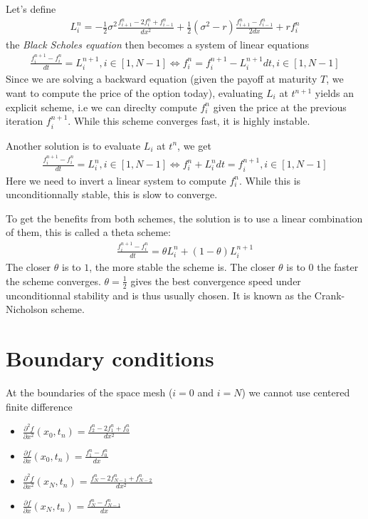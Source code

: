 \documentclass[a4paper]{article}
\begin{document}
Let's define
\begin{gather*}L_i^n = -\frac{1}{2}\sigma^2\frac{f_{i+1}^n - 2 f_i^n + f_{i-1}^n}{dx^2} + \frac{1}{2}(\sigma^2 - r)  \frac{f_{i+1}^n - f_{i-1}^n}{2dx} + rf_i^n
\end{gather*}  the \textit{Black Scholes equation} then becomes a system of linear equations
\begin{gather*}
\frac{f_i^{n+1} - f_i^{n}}{dt} = L_i^{n+1}, i \in [1, N-1] \Longleftrightarrow
f_i^n = f_i^{n+1} - L_i^{n+1}dt, i \in [1, N-1]
\end{gather*}
Since we are solving a backward equation (given the payoff at maturity $T$, we want to compute the price of the option today), evaluating $L_i$ 
at $t^{n+1}$ yields an explicit scheme, i.e we can direclty compute $f_i^n$ given the price at the previous iteration $f_i^{n+1}$. While this scheme
converges fast, it is highly instable.

Another solution is to evaluate $L_i$ at $t^n$, we get
\begin{gather*}
\frac{f_i^{n+1} - f_i^{n}}{dt} = L_i^{n}, i \in [1, N-1] \Longleftrightarrow
f_i^n + L_i^n dt = f_i^{n+1}, i \in [1, N-1]
\end{gather*}
Here we need to invert a linear system to compute $f_i^n$. While this is unconditionnally stable, this is slow to converge.

To get the benefits from both schemes, the solution is to use a linear combination of them, this is called a theta scheme:
\begin{gather*}
\frac{f_i^{n+1} - f_i^{n}}{dt} = \theta L_i^n + (1-\theta) L_i^{n+1}
\end{gather*}
The closer $\theta$ is to $1$, the more stable the scheme is. The closer $\theta$ is to $0$ the faster the scheme converges. $\theta = \frac{1}{2}$ gives
the best convergence speed under unconditionnal stability and is thus usually chosen. It is known as the Crank-Nicholson scheme.

\section{Boundary conditions}

At the boundaries of the space mesh ($i = 0$ and $i = N$) we cannot use centered finite difference
\begin{itemize}
\item $\frac{\partial^2 f}{\partial x^2}(x_0, t_n) = \frac{f_{2}^n - 2f_{1}^n + f_{0}^n}{dx^2}$
\item $\frac{\partial f}{\partial x}(x_0, t_n) = \frac{f_{1}^n - f_{0}^n}{dx}$
\item $\frac{\partial^2 f}{\partial x^2}(x_N, t_n) = \frac{f_{N}^n - 2f_{N-1}^n + f_{N-2}^n}{dx^2}$
\item $\frac{\partial f}{\partial x}(x_N, t_n) = \frac{f_{N}^n - f_{N-1}^n}{dx}$
\end{itemize}
\end{document}
